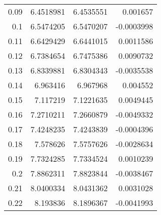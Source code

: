 \begin{table}
\begin{latin}
\begin{tabular}{rrrr}
			0.09                     & 6.4518981                                  & 6.4535551                                     & 0.001657                  \\
			0.1                      & 6.5474205                                  & 6.5470207                                     & -0.0003998                \\
			0.11                     & 6.6429429                                  & 6.6441015                                     & 0.0011586                 \\
			0.12                     & 6.7384654                                  & 6.7475386                                     & 0.0090732                 \\
			0.13                     & 6.8339881                                  & 6.8304343                                     & -0.0035538                \\
			0.14                     & 6.963416                                   & 6.967968                                      & 0.004552                  \\
			0.15                     & 7.117219                                   & 7.1221635                                     & 0.0049445                 \\
			0.16                     & 7.2710211                                  & 7.2660879                                     & -0.0049332                \\
			0.17                     & 7.4248235                                  & 7.4243839                                     & -0.0004396                \\
			0.18                     & 7.578626                                   & 7.5757626                                     & -0.0028634                \\
			0.19                     & 7.7324285                                  & 7.7334524                                     & 0.0010239                 \\
			0.2                      & 7.8862311                                  & 7.8823844                                     & -0.0038467                \\
			0.21                     & 8.0400334                                  & 8.0431362                                     & 0.0031028                 \\
			0.22                     & 8.193836                                   & 8.1896367                                     & -0.0041993                \\

\end{tabular}
\end{latin}
\end{table}
